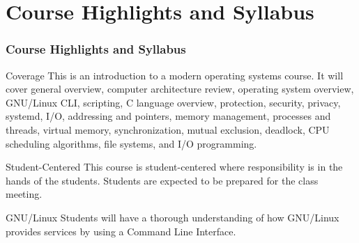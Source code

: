 \documentclass[xcolor=table, notheorems, hyperref={pdfpagelabels=false}]{beamer}
\begin{document}
\section{Course Highlights and Syllabus} 
\begin{frame}
\frametitle{Course Highlights and Syllabus}
\begin{block}{Coverage}
This is an introduction to a modern operating systems course. 
It will cover
general overview,
computer architecture review,
operating system overview,
GNU/Linux CLI,
scripting,
C language overview,
protection,
security,
privacy,
systemd,
I/O,
addressing and pointers,
memory management, 
processes and threads, 
virtual memory,
synchronization,
mutual exclusion, 
deadlock, 
CPU scheduling algorithms, 
file systems,
and
I/O programming.
\end{block}

\begin{block}{Student-Centered}
This course is student-centered where responsibility is
in the hands of the students. Students are expected to 
be prepared for the class meeting.
\end{block}

\begin{block}{GNU/Linux}
Students will have a thorough understanding of how GNU/Linux 
provides services by using a Command Line Interface.
\end{block}

\end{frame}














\end{document}
